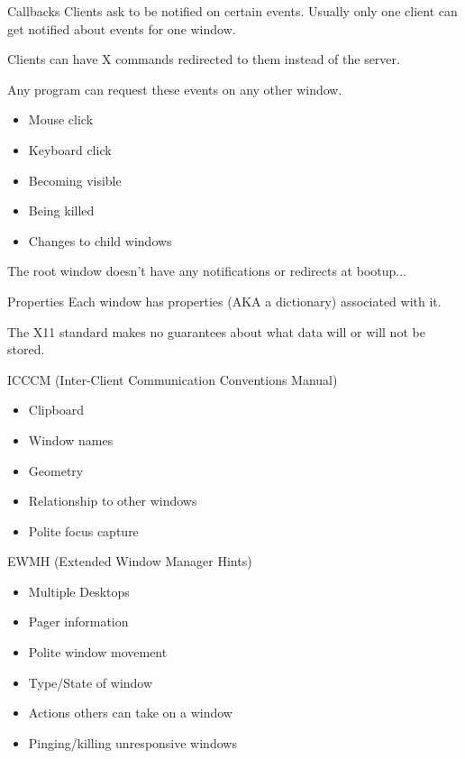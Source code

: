 \documentclass[10pt]{beamer}
\begin{document}
\begin{frame}{Callbacks}
  Clients ask to be notified on certain events. Usually only one client can
  get notified about events for one window.

  Clients can have X commands redirected to them instead of the server.

  \pause
  Any program can request these events on any other window.

  \pause
  \begin{itemize}[<+->]
    \item Mouse click
    \item Keyboard click
    \item Becoming visible
    \item Being killed
    \item Changes to child windows
  \end{itemize}
  \pause
  The root window doesn't have any notifications or redirects at bootup...
\end{frame}
\begin{frame}{Properties}
  Each window has properties (AKA a dictionary) associated with it.

  \pause
  The X11 standard makes no guarantees about what data will or will not be
  stored.

  \pause
  ICCCM (Inter-Client Communication Conventions Manual)
  \begin{itemize}
    \item Clipboard
    \item Window names
    \item Geometry
    \item Relationship to other windows
    \item Polite focus capture
  \end{itemize}
  \pause
  EWMH (Extended Window Manager Hints)
  \begin{itemize}
    \item Multiple Desktops
    \item Pager information
    \item Polite window movement
    \item Type/State of window
    \item Actions others can take on a window
    \item Pinging/killing unresponsive windows
  \end{itemize}
\end{frame}
\end{document}
